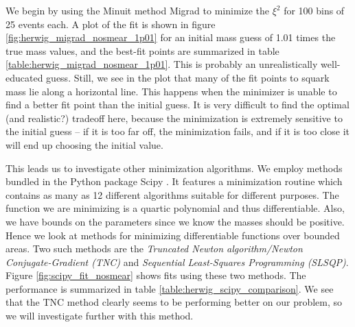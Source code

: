 \documentclass[twoside,english]{uiofysmaster}
\begin{document}
We begin by using the Minuit method Migrad to minimize the $\xi^2$ for 100 bins of 25 events each. A plot of the fit is shown in figure \ref{fig:herwig_migrad_nosmear_1p01} for an initial mass guess of 1.01 times the true mass values, and the best-fit points are summarized in table \ref{table:herwig_migrad_nosmear_1p01}. This is probably an unrealistically well-educated guess. Still, we see in the plot that many of the fit points to squark mass lie along a horizontal line. This happens when the minimizer is unable to find a better fit point than the initial guess. It is very difficult to find the optimal (and realistic?) tradeoff here, because the minimization is extremely sensitive to the initial guess -- if it is too far off, the minimization fails, and if it is too close it will end up choosing the initial value.

This leads us to investigate other minimization algorithms. We employ methods bundled in the Python package {\ttfamily Scipy} \cite{SciPy}. It features a minimization routine which contains as many as 12 different algorithms suitable for different purposes. The function we are minimizing is a quartic polynomial and thus differentiable. Also, we have bounds on the parameters since we know the masses should be positive. Hence we look at methods for minimizing differentiable functions over bounded areas. Two such methods are the {\it Truncated Newton algorithm/Newton Conjugate-Gradient (TNC)}\cite{Nash:1984} and {\it Sequential Least-Squares Programming (SLSQP)}\cite{Kraft:1988}.  Figure \ref{fig:scipy_fit_nosmear} shows fits using these two methods. The performance is summarized in table \ref{table:herwig_scipy_comparison}. We see that the TNC method clearly seems to be performing better on our problem, so we will investigate further with this method. 
\end{document}

